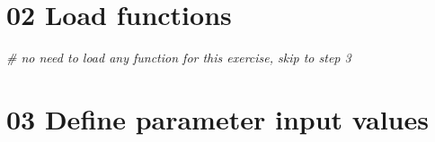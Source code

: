 \documentclass[
]{article}
\newenvironment{Shaded}{\begin{snugshade}}{\end{snugshade}}
\newcommand{\CommentTok}[1]{\textcolor[rgb]{0.56,0.35,0.01}{\textit{#1}}}
\begin{document}
\hypertarget{load-functions}{%
\section{02 Load functions}\label{load-functions}}

\begin{Shaded}
\begin{Highlighting}[]
\CommentTok{# no need to load any function for this exercise, skip to step 3}
\end{Highlighting}
\end{Shaded}

\hypertarget{define-parameter-input-values}{%
\section{03 Define parameter input
values}\label{define-parameter-input-values}}
\end{document}
